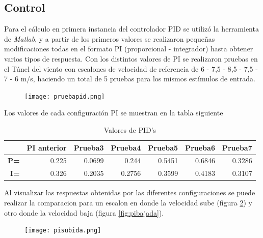     \subsection{Control}
    Para el cálculo en primera instancia del controlador PID se utilizó la herramienta de \textit{Matlab}, y a partir de los primeros valores se realizaron pequeñas modificaciones todas en el formato PI (proporcional - integrador) hasta obtener varios tipos de respuesta.
    Con los distintos valores de PI se realizaron pruebas en el Túnel del viento con escalones de velocidad de referencia de 6 - 7,5 - 8,5 - 7,5 - 7 - 6 m/s, haciendo un total de 5 pruebas para los mismos estímulos de entrada. 
   
    \begin{figure}[H]
    	\centering
    	\texttt{[image: pruebapid.png]}
    	\label{fig:PI3}
    \end{figure}
    
    Los valores de cada configuración PI se muestran en la tabla siguiente
    \begin{table}[H]
    	\centering
    	\begin{tabular}{r|r|r|r|r|r|r|}
    		\cline{2-7}
    		\multicolumn{1}{l|}{} & \multicolumn{1}{c|}{\textbf{PI anterior}} & \multicolumn{1}{c|}{\textbf{Prueba3}} & \multicolumn{1}{c|}{\textbf{Prueba4}} & \multicolumn{1}{c|}{\textbf{Prueba5}} & \multicolumn{1}{c|}{\textbf{Prueba6}} & \multicolumn{1}{c|}{\textbf{Prueba7}} \\ \hline
    		\multicolumn{1}{|r|}{\textbf{P=}} & 0.225 & 0.0699 & 0.244 & 0.5451 & 0.6846 & 0.3286 \\ \hline
    		\multicolumn{1}{|r|}{\textbf{I=}} & 0.326 & 0.2035 & 0.2756 & 0.3599 & 0.4183 & 0.3107 \\ \hline
    	\end{tabular}
    \caption{Valores de PID's}
    \end{table}
    
    Al visualizar las respuestas obtenidas por las diferentes configuraciones se puede realizar la comparacion para un escalon en donde la velocidad sube (figura \ref{fig:pisubuda}) y otro donde la velocidad baja (figura \ref{fig:pibajada}).
    
    \begin{figure}[H]
    	\centering
    	\texttt{[image: pisubida.png]}
    	\label{fig:pisubuda}
    \end{figure}
    
